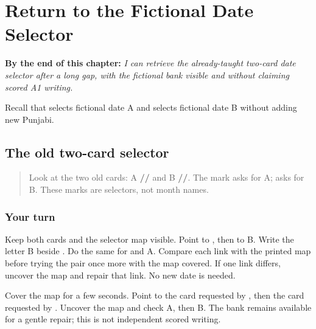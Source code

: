 
\chapter{Return to the Fictional Date Selector}
\label{ch:pa-date-selector-r4}

\begin{chapteropening}
\textbf{By the end of this chapter:} \emph{I can retrieve the already-taught two-card date selector after a long gap, with the fictional bank visible and without claiming scored A1 writing.}

Recall that  selects fictional date A and  selects fictional date B without adding new Punjabi.
\end{chapteropening}

\section[\texorpdfstring{\pa{ਕ} · \pa{ਖ} (the two familiar …)}{ਕ · ਖ (the two familiar …)}]{The old two-card selector}

\label{lesson:PA-R170-date-selector-again}



\begin{quote}
Look at the two old cards: A \textbf{//} and B \textbf{//}. The mark \textbf{} asks for A; \textbf{} asks for B. These marks are selectors, not month names.
\end{quote}

\subsection*{Your turn}
Keep both cards and the selector map visible. Point to \textbf{}, then to B. Write the letter B beside \textbf{}. Do the same for \textbf{} and A. Compare each link with the printed map before trying the pair once more with the map covered. If one link differs, uncover the map and repair that link. No new date is needed.

\begin{tcolorbox}[breakable,colback=teal!4,colframe=teal!35!black,title={Before you move on}]
Cover the map for a few seconds. Point to the card requested by \textbf{}, then the card requested by \textbf{}. Uncover the map and check A, then B. The bank remains available for a gentle repair; this is not independent scored writing.
\end{tcolorbox}
